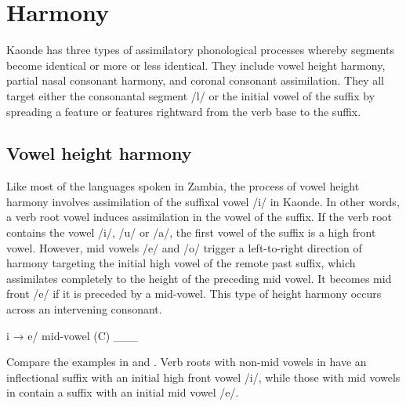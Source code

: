 \documentclass[output=paper]{langsci/langscibook}
\begin{document}
\section{Harmony} \label{§2:harmony.kawasha}

Kaonde has three types of assimilatory phonological processes whereby segments become identical or more or less identical. They include vowel height harmony, partial nasal consonant harmony, and coronal consonant assimilation. They all target either the consonantal segment /l/ or the initial vowel of the suffix by spreading a feature or features rightward from the verb base to the suffix.

\subsection{Vowel height harmony}

Like most of the languages spoken in Zambia, the process of vowel height harmony involves assimilation of the suffixal vowel /i/ in Kaonde. In other words, a verb root vowel induces assimilation in the vowel of the suffix. If the verb root contains the vowel /i/, /u/ or /a/, the first vowel of the suffix is a high front vowel. However, mid vowels /e/ and /o/ trigger a left-to-right direction of harmony targeting the initial high vowel of the remote past suffix, which assimilates completely to the height of the preceding mid vowel. It becomes mid front /e/ if it is preceded by a mid-vowel. This type of height harmony occurs across an intervening consonant.

\ea
\label{ex:2.kawasha}
i → e/ mid-vowel (C) \_\_\_

\z

Compare the examples in  and . Verb roots with non-mid vowels in  have an inflectional suffix with an initial high front vowel /i/, while those with mid vowels in  contain a suffix with an initial mid vowel /e/. 
\end{document}

